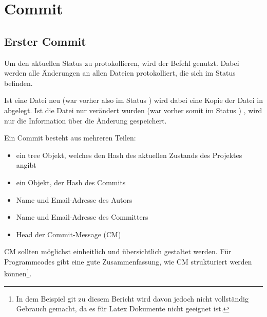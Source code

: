 \section{Commit}
\subsection{Erster Commit}\label{sec:first_commit}
Um den aktuellen Status zu protokollieren, wird der Befehl  genutzt. Dabei werden alle Änderungen an allen Dateien protokolliert, die sich im Status  befinden.

Ist eine Datei neu (war vorher also im Status ) wird dabei eine Kopie der Datei in  abgelegt. Ist die Datei nur verändert wurden (war vorher somit im Status ) , wird nur die Information über die Änderung gespeichert.

Ein Commit besteht aus mehreren Teilen: 
\begin{itemize}
	\item ein tree Objekt, welches den Hash des aktuellen Zustands des Projektes angibt
	\item ein  Objekt, der Hash des  Commits
	\item Name und Email-Adresse des Autors
	\item Name und Email-Adresse des Committers
	\item Head der Commit-Message (CM)
\end{itemize}
CM sollten möglichst einheitlich und übersichtlich gestaltet werden. Für Programmcodes gibt \cite{conv-Commit} eine gute Zusammenfassung, wie CM strukturiert werden können\footnote{In dem Beispiel git zu diesem Bericht wird davon jedoch nicht vollständig Gebrauch gemacht, da es für Latex Dokumente nicht geeignet ist.}.

